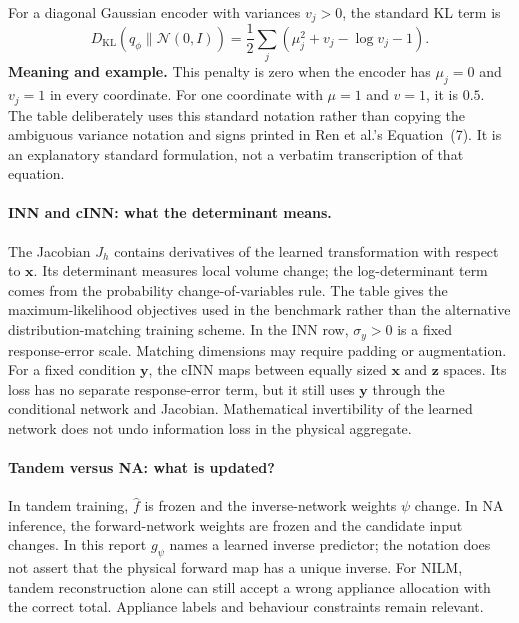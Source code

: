 \documentclass[11pt]{article}
\newcommand{\vect}[1]{\mathbf{#1}}
\begin{document}
For a diagonal Gaussian encoder with variances $v_j>0$, the standard KL term is~\cite{kingma2013}
\begin{equation}
    D_{\mathrm{KL}}\!\left(q_\phi\|\mathcal{N}(0,I)\right)
    =\frac12\sum_j\left(\mu_j^2+v_j-\log v_j-1\right).
    \label{eq:benchmark_vae_kl}
\end{equation}
\textbf{Meaning and example.} This penalty is zero when the encoder has $\mu_j=0$ and $v_j=1$ in every coordinate. For one coordinate with $\mu=1$ and $v=1$, it is $0.5$. The table deliberately uses this standard notation rather than copying the ambiguous variance notation and signs printed in Ren et al.'s Equation~(7). It is an explanatory standard formulation, not a verbatim transcription of that equation.

\paragraph{INN and cINN: what the determinant means.}
The Jacobian $J_h$ contains derivatives of the learned transformation with respect to $\vect{x}$. Its determinant measures local volume change; the log-determinant term comes from the probability change-of-variables rule. The table gives the maximum-likelihood objectives used in the benchmark rather than the alternative distribution-matching training scheme. In the INN row, $\sigma_y>0$ is a fixed response-error scale. Matching dimensions may require padding or augmentation. For a fixed condition $\vect{y}$, the cINN maps between equally sized $\vect{x}$ and $\vect{z}$ spaces. Its loss has no separate response-error term, but it still uses $\vect{y}$ through the conditional network and Jacobian. Mathematical invertibility of the learned network does not undo information loss in the physical aggregate.

\paragraph{Tandem versus NA: what is updated?}
In tandem training, $\hat f$ is frozen and the inverse-network weights $\psi$ change. In NA inference, the forward-network weights are frozen and the candidate input changes. In this report $g_\psi$ names a learned inverse predictor; the notation does not assert that the physical forward map has a unique inverse. For NILM, tandem reconstruction alone can still accept a wrong appliance allocation with the correct total. Appliance labels and behaviour constraints remain relevant.
\end{document}
